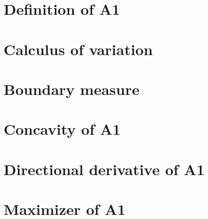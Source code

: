 
\section{Definition of A1}
\label{sec:definition-of-a1}


\section{Calculus of variation}
\label{sec:calculus-of-variation}


\section{Boundary measure}
\label{sec:boundary-measure}


\section{Concavity of A1}
\label{sec:concavity-of-a1}


\section{Directional derivative of A1}
\label{sec:directional-derivative-of-a1}


\section{Maximizer of A1}
\label{sec:maximizer-of-a1}


